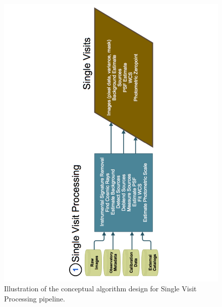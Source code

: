 \documentclass[SE,lsstdraft,toc]{lsstdoc}
\begin{document}
\begin{figure}[!t]
    \centering
    \vskip -1.1in
    \includegraphics[scale=0.505, angle=270]{gliffy/SingleVisitProcessing}
    \vskip -1.1in
    \caption{Illustration of the conceptual algorithm design for Single Visit Processing pipeline.\label{fig:Pipe1}}
\end{figure}
\end{document}
